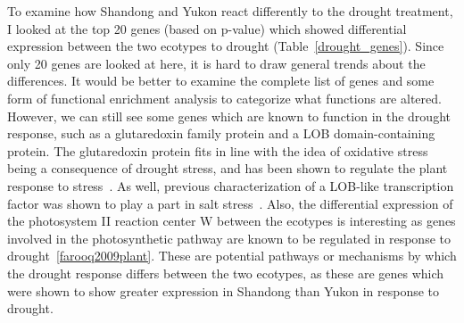 \documentclass[12pt]{article}
\begin{document}
	To examine how Shandong and Yukon react differently to the drought treatment, I looked at the top 20 genes (based on p-value) which showed differential expression between the two ecotypes to drought (Table~\ref{drought_genes}). Since only 20 genes are looked at here, it is hard to draw general trends about the differences. It would be better to examine the complete list of genes and some form of functional enrichment analysis to categorize what functions are altered. However, we can still see some genes which are known to function in the drought response, such as a glutaredoxin family protein and a LOB domain-containing protein. The glutaredoxin protein fits in line with the idea of oxidative stress being a consequence of drought stress, and has been shown to regulate the plant response to stress~\cite{guo2010tomato}. As well, previous characterization of a LOB-like transcription factor was shown to play a part in salt stress~\cite{ariel2010lob}. Also, the differential expression of the photosystem II reaction center W between the ecotypes is interesting as genes involved in the photosynthetic pathway are known to be regulated in response to drought~\ref{farooq2009plant}. These are potential pathways or mechanisms by which the drought response differs between the two ecotypes, as these are genes which were shown to show greater expression in Shandong than Yukon in response to drought.
	
\end{document}
